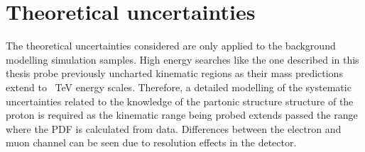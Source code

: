 \section{Theoretical uncertainties}
The theoretical uncertainties considered are only applied to the background modelling simulation samples. High energy searches like the one described in this thesis probe previously uncharted kinematic regions as their mass predictions extend to \SI{}{\tera\electronvolt} energy scales. Therefore, a detailed modelling of the systematic uncertainties related to the knowledge of the partonic structure structure of the proton is required as the kinematic range being probed extends passed the range where the PDF is calculated from data. Differences between the electron and muon channel can be seen due to resolution effects in the detector. 

